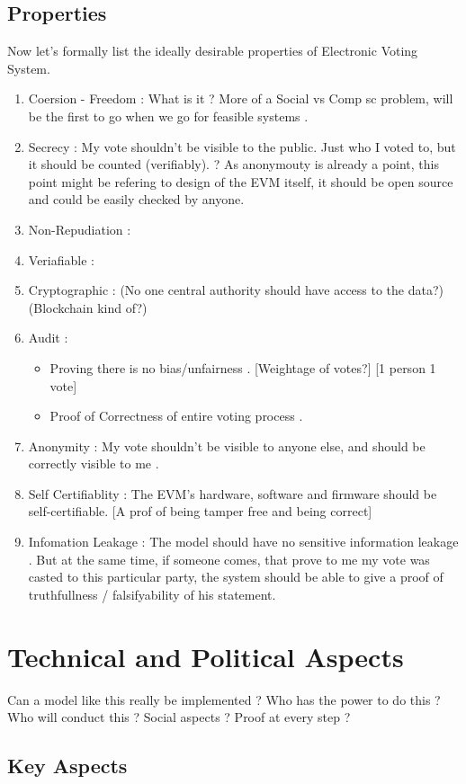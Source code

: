 \documentclass[12pt]{report}
\begin{document}
\section{Properties}
Now let's formally list the ideally desirable properties of Electronic Voting System.
\begin{enumerate}
  \item Coersion - Freedom : What is it ? More of a Social vs Comp sc problem, will be the first to go when we go for feasible systems .
  \item Secrecy : My vote shouldn't be visible to the public. Just who I voted to, but it should be counted (verifiably). 
  ? As anonymouty is already a point, this point might be refering to design of the EVM itself, it should be open source and could be easily checked by anyone.
  \item Non-Repudiation : 
  \item Veriafiable : 
  \item Cryptographic : (No one central authority should have access to the data?) (Blockchain kind of?)
  \item Audit : 
  \begin{itemize}
    \item Proving there is no bias/unfairness . [Weightage of votes?] [1 person 1 vote]
    \item Proof of Correctness of entire voting process .
  \end{itemize}
  \item Anonymity : My vote shouldn't be visible to anyone else, and should be correctly visible to me .
  \item Self Certifiablity : The EVM's hardware, software and firmware should be self-certifiable. [A prof of being tamper free and being correct]
  \item Infomation Leakage : The model should have no sensitive information leakage . But at the same time, if someone comes, that prove to me my vote was casted to this particular party, the system should be able to give a proof of truthfullness / falsifyability of his statement.
\end{enumerate}

\chapter{Technical and Political Aspects}
Can a model like this really be implemented ? Who has the power to do this ? Who will conduct this ?
Social aspects ? Proof at every step ?
\section{Key Aspects}
\end{document}
